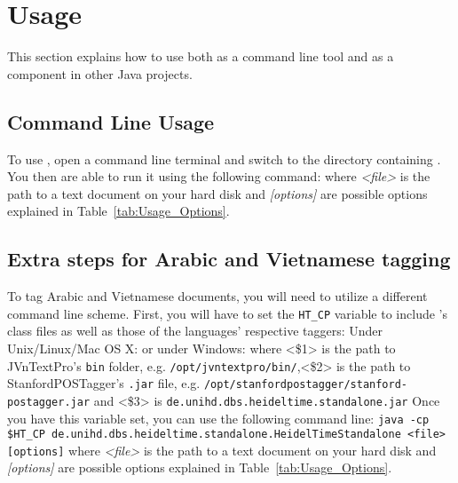 \section{Usage}\label{sec:Usage}
This section explains how to use \product{} both as a command line tool and as a component in other Java projects.

\subsection{Command Line Usage}\label{sec:Usage_CommandLine}
To use \product{}, open a command line terminal and switch to the directory containing \executableFile{}. You then are able to run it using the following command:\newline {} where \emph{<file>} is the path to a text document on your hard disk and \emph{[options]} are possible options explained in Table~\ref{tab:Usage_Options}.
\subsection*{Extra steps for Arabic and Vietnamese tagging}\label{taggersetup}
To tag Arabic and Vietnamese documents, you will need to utilize a different command line scheme. First, you will have to set the \texttt{HT\_CP} variable to include \product{}'s class files as well as those of the languages' respective taggers:\newline
\newline
Under Unix/Linux/Mac OS X: \newline
\indent {} \newline\newline
or under Windows: \newline
\indent {} \newline\newline
where \newline
<\$1> is the path to JVnTextPro's \texttt{bin} folder, e.g. \texttt{/opt/jvntextpro/bin/},\newline <\$2> is the path to StanfordPOSTagger's \texttt{.jar} file, e.g. \newline\texttt{/opt/stanfordpostagger/stanford-postagger.jar} and \newline
<\$3> is \texttt{de.unihd.dbs.heideltime.standalone.jar} \newline\newline
Once you have this variable set, you can use the following command line:\newline
\texttt{java -cp \$HT\_CP de.unihd.dbs.heideltime.standalone.HeidelTimeStandalone \newline <file> [options]}\newline
where \emph{<file>} is the path to a text document on your hard disk and \emph{[options]} are possible options explained in Table~\ref{tab:Usage_Options}.


